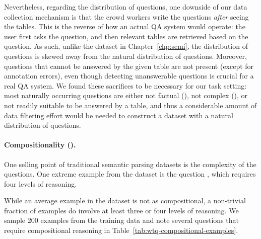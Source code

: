 Nevertheless,
regarding the distribution of questions,
one downside of our data collection mechanism
is that the crowd workers write the questions
\emph{after} seeing the tables.
This is the reverse of how an actual QA system would operate:
the user first asks the question,
and then relevant tables are retrieved
based on the question.
As such,
unlike the  dataset in Chapter~\ref{chp:semi},
the distribution of questions is skewed away from
the natural distribution of questions.
Moreover,
questions that cannot be answered by the given table
are not present (except for annotation errors),
even though detecting unanswerable questions
is crucial for a real QA system.
We found these sacrifices to be necessary for our task setting:
most naturally occurring questions are either
not factual (),
not complex (),
or not readily suitable to be answered by a table,
and thus a considerable amount of data filtering effort
would be needed to construct a dataset with
a natural distribution of questions.

\paragraph{Compositionality (\Depth).}

One selling point of traditional semantic parsing datasets
is the complexity of the questions.
One extreme example from the  dataset
is the question
,
which requires four levels of reasoning.

While an average example in the \wtq dataset
is not as compositional,
a non-trivial fraction of examples
do involve at least three or four levels of reasoning.
We sample 200 examples from the training data
and note several questions that require compositional
reasoning in Table~\ref{tab:wtq-compositional-examples}.

